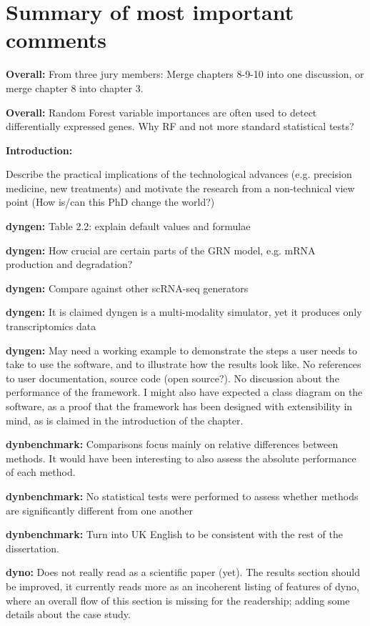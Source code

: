 \documentclass[10pt]{article}
\begin{document}
\section{Summary of most important comments}

\textbf{Overall:} From three jury members: Merge chapters 8-9-10 into one discussion, or merge chapter 8 into chapter 3.

\textbf{Overall:} Random Forest variable importances are often used to detect differentially expressed genes. Why RF and not more standard statistical tests?

\textbf{Introduction:} {Describe the practical implications of the
		technological advances (e.g. precision medicine, new treatments) and
		motivate the research from a non-technical view point (How is/can this PhD
		change the world?)
	
\textbf{dyngen:} {Table 2.2: explain default values and formulae}

\textbf{dyngen:} {How crucial are certain parts of the GRN model, e.g. mRNA production and degradation?}

\textbf{dyngen:} {Compare against other scRNA-seq generators}

\textbf{dyngen:} {It is claimed dyngen is a multi-modality simulator, yet it produces only transcriptomics data}

\textbf{dyngen:} May need a working example to demonstrate the steps a user needs to take to use the software, and to illustrate how the results look like. No references to user documentation, source code (open source?). No discussion about the performance of the framework. 
I might also have expected a class diagram on the software, as a proof that the framework has been designed with extensibility in mind, as is claimed in the introduction of the chapter. 

\textbf{dynbenchmark:} {Comparisons focus mainly on relative differences between methods. It would have been interesting to also assess the absolute performance of each method.}

\textbf{dynbenchmark:} {No statistical tests were performed to assess whether methods are significantly different from one another}

\textbf{dynbenchmark:} Turn into UK English to be consistent with the rest of the dissertation.

\textbf{dyno:} Does not really read as a scientific paper (yet). The results section should be improved, it currently reads more as an incoherent listing of features of dyno, where an overall flow of this section is missing for the readership; adding some details about the case study.

}
\end{document}
